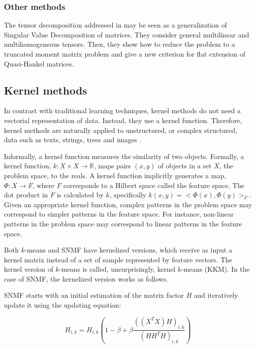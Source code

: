 \documentclass[letterpaper,12pt]{article}
\begin{document}

\subsubsection{Other methods}

 The tensor decomposition addressed in \cite{Bernardi2013} may be seen as a generalization of Singular Value Decomposition of matrices. They consider general multilinear and multihomogeneous tensors. Then, they show how to reduce the problem to a truncated moment matrix problem and give a new criterion for flat extension of Quasi-Hankel matrices. 

 
\subsection{Kernel methods}

In contrast with traditional learning techniques, kernel methods do not need a vectorial representation of data. Instead, they use a kernel function. Therefore, kernel methods are naturally applied to unstructured, or complex structured, data such as texts, strings, trees and images \cite{Shawe-Taylor2004}. 

Informally, a kernel function measures the similarity of two objects. Formally, a kernel function, $k:X\times X\rightarrow\mathbb{R}$,
maps pairs $(x,y)$ of objects in a set $X$, the problem space, to the reals. A kernel function implicitly generates a map, $\Phi:X\rightarrow F$, where $F$ corresponds to a Hilbert space called the feature space. The dot product in $F$ is calculated by $k$, specifically $k(x,y)=<\Phi(x),\Phi(y)>_{F}$. Given an appropriate kernel function, complex patterns in the problem space may correspond to simpler patterns in the feature space. For instance, non-linear patterns in the problem space may correspond to linear patterns in the feature space. 


Both $k$-means and SNMF have kernelized versions, which receive as input a kernel matrix instead of a set of sample represented by feature vectors. The kernel version of $k$-means is called, unsurprisingly, kernel $k$-means (KKM). In the case of SNMF, the kernelized version works as follows.

SNMF starts with an initial estimation of the matrix factor $H$ and iteratively update it using the updating equation:

\[
H_{i,k}=H_{i,k}(1-\beta+\beta\frac{((X^{T}X)H)_{i,k}}{(HH^{T}H)_{i,k}})
\]
\end{document}
